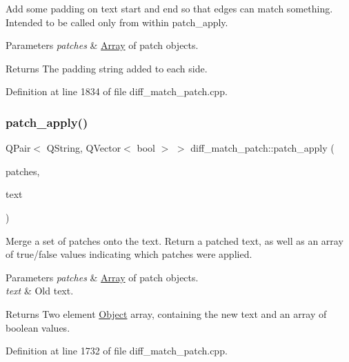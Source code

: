Add some padding on text start and end so that edges can match something. Intended to be called only from within patch\+\_\+apply. 
\begin{DoxyParams}{Parameters}
{\em patches} & \hyperlink{class_array}{Array} of patch objects. \\
\hline
\end{DoxyParams}
\begin{DoxyReturn}{Returns}
The padding string added to each side. 
\end{DoxyReturn}


Definition at line 1834 of file diff\+\_\+match\+\_\+patch.\+cpp.

\mbox{\label{classdiff__match__patch_acbdd755dfb40abc85760b4f8fbcdc98f}} 
\subsubsection{\texorpdfstring{patch\+\_\+apply()}{patch\_apply()}}
{\footnotesize\ttfamily Q\+Pair$<$ Q\+String, Q\+Vector$<$ bool $>$ $>$ diff\+\_\+match\+\_\+patch\+::patch\+\_\+apply (\begin{DoxyParamCaption}\item[{Q\+List$<$ \hyperlink{class_patch}{Patch} $>$ \&}]{patches,  }\item[{const Q\+String \&}]{text }\end{DoxyParamCaption})}

Merge a set of patches onto the text. Return a patched text, as well as an array of true/false values indicating which patches were applied. 
\begin{DoxyParams}{Parameters}
{\em patches} & \hyperlink{class_array}{Array} of patch objects. \\
\hline
{\em text} & Old text. \\
\hline
\end{DoxyParams}
\begin{DoxyReturn}{Returns}
Two element \hyperlink{class_object}{Object} array, containing the new text and an array of boolean values. 
\end{DoxyReturn}


Definition at line 1732 of file diff\+\_\+match\+\_\+patch.\+cpp.

\mbox{\label{classdiff__match__patch_aa4b405c41f79af23a8e60129c8e9a721}} 
